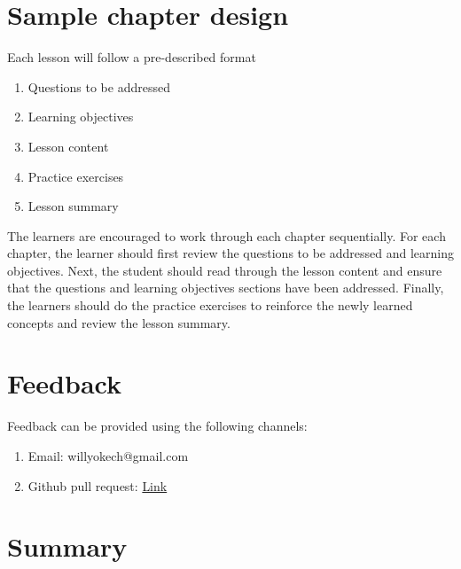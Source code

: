 \documentclass[
  letterpaper,
  DIV=11,
  numbers=noendperiod]{scrreprt}
\begin{document}
\section*{Sample chapter design}\label{sample-chapter-design}


Each lesson will follow a pre-described format

\begin{enumerate}
\def\labelenumi{\roman{enumi}.}
\item
  Questions to be addressed
\item
  Learning objectives
\item
  Lesson content
\item
  Practice exercises
\item
  Lesson summary
\end{enumerate}

The learners are encouraged to work through each chapter sequentially.
For each chapter, the learner should first review the questions to be
addressed and learning objectives. Next, the student should read through
the lesson content and ensure that the questions and learning objectives
sections have been addressed. Finally, the learners should do the
practice exercises to reinforce the newly learned concepts and review
the lesson summary.

\section*{Feedback}\label{feedback}


Feedback can be provided using the following channels:

\begin{enumerate}
\def\labelenumi{\roman{enumi}.}
\item
  Email: willyokech@gmail.com
\item
  Github pull request: \href{https://github.com/wokech/r4novice}{Link}
\end{enumerate}

\section*{Summary}\label{summary}

\end{document}
